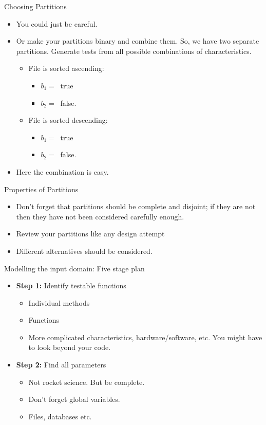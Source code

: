 \documentclass{beamer}
\begin{document}
\begin{frame}{Choosing Partitions}

  \begin{itemize}
  \item You could just be careful.
  \item Or make your partitions binary and combine them. So, we have two
    separate partitions. Generate tests from all possible combinations of
    characteristics. 
    \begin{itemize}
    \item File is sorted ascending:
      \begin{itemize}
      \item $b_1 = \ $ true
      \item $b_2 = \ $ false.
      \end{itemize}
    \item File is sorted descending:
      \begin{itemize}
      \item $b_1 = \ $ true
      \item $b_2 = \ $ false.
      \end{itemize}
    \end{itemize}
    \item Here the combination  is easy. 
  \end{itemize} 
\end{frame}
\begin{frame}{Properties of Partitions}
  \begin{itemize}
  \item Don't forget that partitions should be complete and disjoint;
    if they are not then they have not been considered carefully
    enough.
    \item Review your partitions like any design attempt
    \item Different alternatives should be considered.
  \end{itemize}
\end{frame}
\begin{frame}{Modelling the input domain: Five stage plan}

  \begin{itemize}
  \item {\bf Step 1:} Identify testable functions
    \begin{itemize}
    \item Individual methods
    \item Functions
    \item More complicated characteristics, hardware/software,
      etc. You might have to look beyond your code.
    \end{itemize}
  \item {\bf Step 2:} Find all parameters
    \begin{itemize}
    \item Not rocket science. But be complete.
    \item Don't forget global variables.
    \item Files, databases etc.
    \end{itemize}
  \end{itemize}
  \end{frame}
\end{document}

